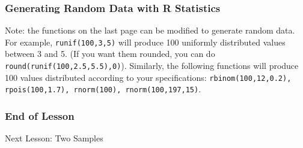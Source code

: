 \documentclass[xcolor=dvipsnames]{beamer}
\begin{document}
\begin{frame}
  \frametitle{Generating Random Data with R Statistics}
Note: the functions on the last page can be modified to generate
random data. For example, \texttt{runif(100,3,5)} will produce 100
uniformly distributed values between 3 and 5. (If you want them
rounded, you can do \texttt{round(runif(100,2.5,5.5),0)}). Similarly,
the following functions will produce 100 values distributed according
to your specifications: \texttt{rbinom(100,12,0.2), rpois(100,1.7),
  rnorm(100), rnorm(100,197,15)}.
\end{frame}

\begin{frame}
  \frametitle{End of Lesson}
Next Lesson: Two Samples
\end{frame}
\end{document}

